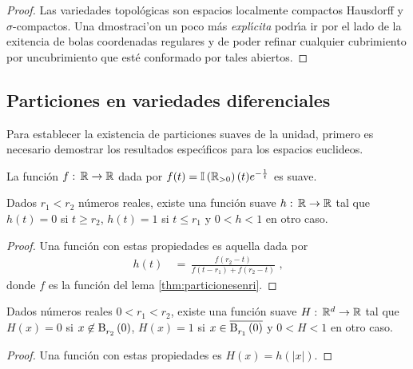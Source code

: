 \begin{proof}
	Las variedades topol\'{o}gicas son espacios localmente compactos
	Hausdorff y $\sigma$-compactos. Una dmostraci'{o}n un poco
	m\'{a}s \emph{expl\'{\i}cita} podr\'{\i}a ir por el lado de
	la exitencia de bolas coordenadas regulares y de poder refinar
	cualquier cubrimiento por uncubrimiento que est\'{e} conformado
	por tales abiertos.
\end{proof}

\subsection{Particiones en variedades diferenciales}
Para establecer la existencia de particiones suaves de la unidad, primero
es necesario demostrar los resultados espec\'{\i}ficos para los espacios
euclideos.

\begin{lemaParticionesEnRI}\label{thm:particionesenri}
	La funci\'{o}n $f:\,\mathbb{R}\rightarrow\mathbb{R}$ dada por
	$f(t)=\mathbb{I}\left(\mathbb{R}_{>0}\right)(t)e^{-\frac{1}{t}}$ es suave.
\end{lemaParticionesEnRI}

\begin{lemaParticionesEnRII}\label{thm:particionesenrii}
	Dados $r_{1}<r_{2}$ n\'{u}meros reales, existe una funci\'{o}n
	suave $h:\,\mathbb{R}\rightarrow\mathbb{R}$ tal que $h(t)=0$ si
	$t\geq r_{2}$, $h(t)=1$ si $t\leq r_{1}$ y $0 <h< 1$ en
	otro caso.
\end{lemaParticionesEnRII}

\begin{proof}
	Una funci\'{o}n con estas propiedades es aquella dada por
	\begin{align*}
		h(t) & \,=\,\frac{f(r_{2}-t)}{f(t-r_{1})+f(r_{2}-t)}
		\text{ ,}
	\end{align*}
	donde $f$ es la funci\'{o}n del lema \ref{thm:particionesenri}.
\end{proof}

\begin{lemaParticionesEnRIII}\label{thm:particionesenriii}
	Dados n\'{u}meros reales $0<r_{1}< r_{2}$, existe una funci\'{o}n
	suave $H:\,\mathbb{R}^{d}\rightarrow\mathbb{R}$ tal que $H(x)=0$ si
	$x\not\in\mathrm{B}^{}_{r_{2}}\left(0\right)$, $H(x)=1$ si $x\in\overline{\mathrm{B}^{}_{r_{1}}\left(0\right)}$
	y $0<H<1$ en otro caso.
\end{lemaParticionesEnRIII}

\begin{proof}
	Una funci\'{o}n con estas propiedades es $H(x)=h(|x|)$.
\end{proof}

